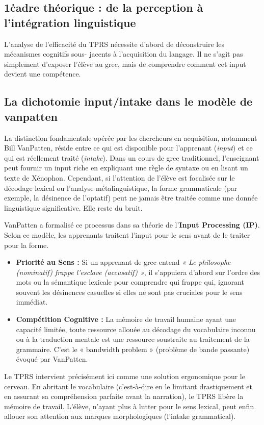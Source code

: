 \subsection{1\. cadre théorique : de la perception à l'intégration linguistique}

L'analyse de l'efficacité du TPRS nécessite d'abord de déconstruire les mécanismes cognitifs sous-
jacents à l'acquisition du langage. Il ne s'agit pas simplement d'exposer l'élève au grec, mais de
comprendre comment cet input devient une compétence.



\subsection{La dichotomie input/intake dans le modèle de vanpatten}

La distinction fondamentale opérée par les chercheurs en acquisition, notamment Bill VanPatten,
réside entre ce qui est disponible pour l'apprenant (\textit{input}) et ce qui est réellement traité
(\textit{intake}). Dans un cours de grec traditionnel, l'enseignant peut fournir un input riche en
expliquant une règle de syntaxe ou en lisant un texte de Xénophon. Cependant, si l'attention de
l'élève est focalisée sur le décodage lexical ou l'analyse métalinguistique, la forme grammaticale
(par exemple, la désinence de l'optatif) peut ne jamais être traitée comme une donnée linguistique
significative. Elle reste du \og bruit\fg{}.\cite{III-2-3-ref3}

VanPatten a formalisé ce processus dans sa théorie de l'\textbf{Input Processing (IP)}. Selon ce
modèle, les apprenants traitent l'input pour le sens avant de le traiter pour la forme.

\begin{itemize}\item \textbf{Priorité au Sens :} Si un apprenant de grec entend \textit{« Le philosophe (nominatif) frappe l'esclave (accusatif) »}, il s'appuiera d'abord sur l'ordre des mots ou la sémantique lexicale pour comprendre qui frappe qui, ignorant souvent les désinences casuelles si elles ne sont pas cruciales pour le sens immédiat.\cite{III-2-3-ref4}\item \textbf{Compétition Cognitive :} La mémoire de travail humaine ayant une capacité limitée, toute ressource allouée au décodage du vocabulaire inconnu ou à la traduction mentale est une ressource soustraite au traitement de la grammaire. C'est le « bandwidth problem » (problème de bande passante) évoqué par VanPatten.\cite{III-2-3-ref5}\end{itemize}Le TPRS intervient précisément ici comme une solution ergonomique pour le cerveau. En \og
abritant\fg{} le vocabulaire (c'est-à-dire en le limitant drastiquement et en assurant sa
compréhension parfaite avant la narration), le TPRS libère la mémoire de travail. L'élève, n'ayant
plus à lutter pour le sens lexical, peut enfin allouer son attention aux marques morphologiques
(l'intake grammatical).\cite{III-2-3-ref6}



